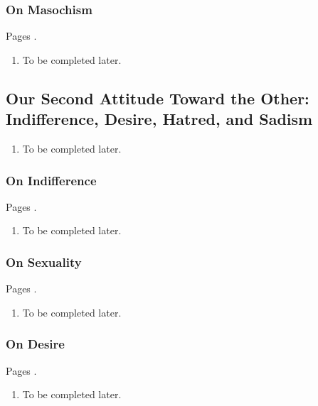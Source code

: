\subsubsection{On Masochism}

Pages \autocite[499 -- 501]{sartre}.

\begin{enumerate}
  \item To be completed later.
\end{enumerate}

\subsection{Our Second Attitude Toward the Other: \\ Indifference, Desire, Hatred, and Sadism}

\begin{enumerate}
  \item To be completed later.
\end{enumerate}

\subsubsection{On Indifference}

Pages \autocite[503 -- 505]{sartre}.

\begin{enumerate}
  \item To be completed later.
\end{enumerate}

\subsubsection{On Sexuality}

Pages \autocite[505 -- 508]{sartre}.

\begin{enumerate}
  \item To be completed later.
\end{enumerate}

\subsubsection{On Desire}

Pages \autocite[508 -- 526]{sartre}.

\begin{enumerate}
  \item To be completed later.
\end{enumerate}

